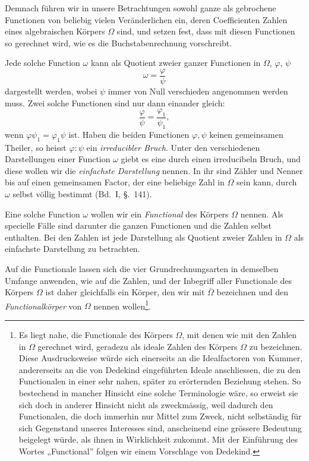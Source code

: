 \documentclass[12pt,a4paper]{article}
\theoremstyle{definition}
\begin{document}
Demnach führen wir in unsere Betrachtungen sowohl ganze als gebrochene Functionen von beliebig vielen Veränderlichen ein, deren Coefficienten Zahlen eines algebraischen Körpers $\Omega$ sind, und setzen fest, dass mit diesen Functionen so gerechnet wird, wie es die Buchstabenrechnung vorschreibt.

Jede solche Function $\omega$ kann als Quotient zweier ganzer Functionen in $\Omega$, $\varphi$, $\psi$
\begin{equation}\label{eq:136-1}
\omega = \frac{\varphi}{\psi}
\end{equation}
dargestellt werden, wobei $\psi$ immer von Null verschieden angenommen werden muss. Zwei solche Functionen sind nur dann einander gleich:
\[
\frac{\varphi}{\psi} = \frac{\varphi_1}{\psi_1},
\]
 wenn $\varphi\psi_1 = \varphi_1\psi$ ist. Haben die beiden Functionen $\varphi,\psi$ keinen gemeinsamen Theiler, so heisst $\varphi:\psi$ ein \emph{irreducibler Bruch}. Unter den verschiedenen Darstellungen einer Function $\omega$ giebt es eine durch einen irreducibeln Bruch, und diese wollen wir die \emph{einfachste Darstellung} nennen. In ihr sind Zähler und Nenner bis auf einen gemeinsamen Factor, der eine beliebige Zahl in $\Omega$ sein kann, durch $\omega$ selbst völlig bestimmt (Bd.~I, \S.~141).

Eine solche Function $\omega$ wollen wir ein \emph{Functional} des Körpers $\Omega$ nennen. Als specielle Fälle sind darunter die ganzen Functionen und die Zahlen selbst enthalten. Bei den Zahlen ist jede Darstellung als Quotient zweier Zahlen in $\Omega$ als einfachste Darstellung zu betrachten.

Auf die Functionale lassen sich die vier Grundrechnungsarten in demselben Umfange anwenden, wie auf die Zahlen, und der Inbegriff aller Functionale des Körpers $\Omega$ ist daher gleichfalls ein Körper, den wir mit $\bar{\Omega}$ bezeichnen und den \emph{Functionalkörper} von $\Omega$ nennen wollen\footnote{Es liegt nahe, die Functionale des Körpers $\Omega$, mit denen wie mit den Zahlen in $\Omega$ gerechnet wird, geradezu als ideale Zahlen des Körpers $\Omega$ zu bezeichnen. Diese Ausdrucksweise würde sich einerseits an die Idealfactoren von Kummer, andererseits an die von Dedekind eingeführten Ideale anschliessen, die zu den Functionalen in einer sehr nahen, später zu erörternden Beziehung stehen. So bestechend in mancher Hinsicht eine solche Terminologie wäre, so erweist sie sich doch in anderer Hinsicht nicht als zweckmässig, weil dadurch den Functionalen, die doch immerhin nur Mittel zum Zweck, nicht selbständig für sich Gegenstand unseres Interesses sind, anscheinend eine grössere Bedeutung beigelegt würde, als ihnen in Wirklichkeit zukommt. Mit der Einführung des Wortes „Functional'' folgen wir einem Vorschlage von Dedekind.}.
\end{document}
